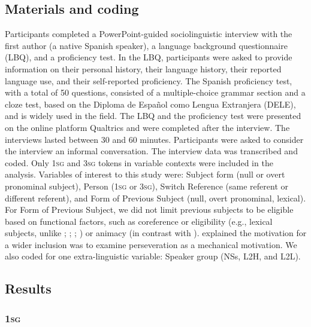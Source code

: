 \documentclass[output=paper,colorlinks,citecolor=brown,draftmode]{langscibook}
\begin{document}
\subsection{Materials and coding}

Participants completed a PowerPoint-guided sociolinguistic interview with the first author (a native Spanish speaker), a language background questionnaire (LBQ), and a proficiency test. In the LBQ, participants were asked to provide information on their personal history, their language history, their reported language use, and their self-reported proficiency. The Spanish proficiency test, with a total of 50 questions, consisted of a multiple-choice grammar section and a cloze test, based on the Diploma de Español como Lengua Extranjera (DELE), and is widely used in the field. The LBQ and the proficiency test were presented on the online platform Qualtrics and were completed after the interview.
The interviews lasted between 30 and 60 minutes. Participants were asked to consider the interview an informal conversation. The interview data was transcribed and coded. Only 1\textsc{sg} and 3\textsc{sg} tokens in variable contexts were included in the analysis. Variables of interest to this study were: Subject form (null or overt pronominal subject), Person (1\textsc{sg} or 3\textsc{sg}), Switch Reference (same referent or different referent), and Form of Previous Subject (null, overt pronominal, lexical). For Form of Previous Subject, we did not limit previous subjects to be eligible based on functional factors, such as coreference or eligibility (e.g., lexical subjects, unlike \citealp{Abreu2009}; \citealp{FloresFerrán2002}; \citealp{TravisCacoullos2012}; \citealp{Travis2007}) or animacy (in contrast with \citealp{Otheguy2015}). \citet{Otheguy2015} explained the motivation for a wider inclusion was to examine perseveration as a mechanical motivation. We also coded for one extra-linguistic variable: Speaker group (NSs, L2H, and L2L).

\subsection{Results}

\subsubsection{1\textsc{sg}}
\end{document}
